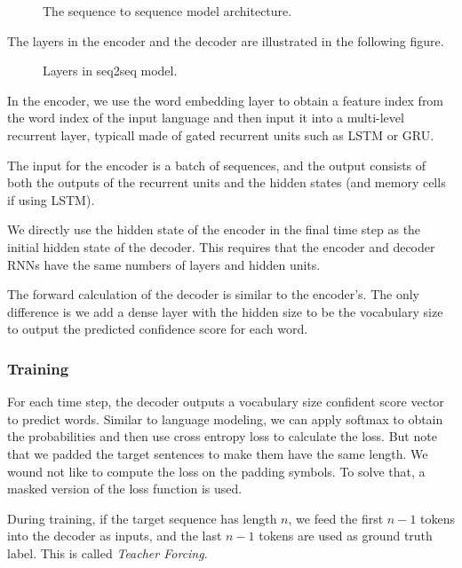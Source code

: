 \begin{figure}[hpt]
	\centering
	
	\caption{The sequence to sequence model architecture.}
	\label{fig:seq2seq}
\end{figure}

The layers in the encoder and the decoder are illustrated in the following figure.

\begin{figure}[hpt]
	\centering
	
	\caption{Layers in seq2seq model.}
	\label{fig:seq2seq_details}
\end{figure}

In the encoder, we use the word embedding layer to obtain a feature index from the word index of the input language and then input it into a multi-level recurrent layer, typicall made of gated recurrent units such as LSTM or GRU. 

The input for the encoder is a batch of sequences, and the output consists of both the outputs of the recurrent units and the hidden states (and memory cells if using LSTM).

We directly use the hidden state of the encoder in the final time step as the initial hidden state of the decoder. This requires that the encoder and decoder RNNs have the same numbers of layers and hidden units.

The forward calculation of the decoder is similar to the encoder's. The only difference is we add a dense layer with the hidden size to be the vocabulary size to output the predicted confidence score for each word.

\subsubsection{Training}

For each time step, the decoder outputs a vocabulary size confident score vector to predict words. Similar to language modeling, we can apply softmax to obtain the probabilities and then use cross entropy loss to calculate the loss. But note that we padded the target sentences to make them have the same length. We wound not like to compute the loss on the padding symbols. To solve that, a masked version of the loss function is used.

During training, if the target sequence has length $n$, we feed the first $n-1$ tokens into the decoder as inputs, and the last $n-1$ tokens are used as ground truth label. This is called \textit{Teacher Forcing}.

